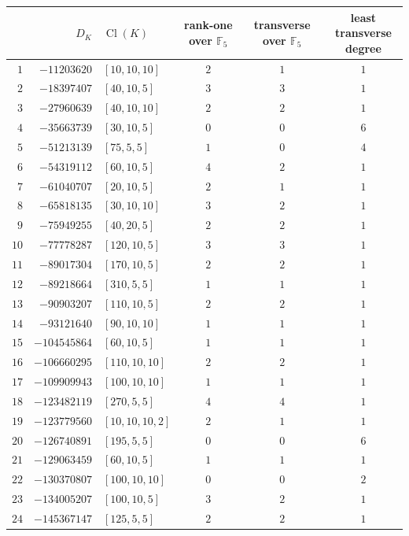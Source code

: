 \documentclass[11pt]{article}
\newcommand{\Ffive}{\mathbb F_5}
\newcommand{\Cl}{\operatorname{Cl}}
\begin{document}
\begin{center}\small
\setlength{\tabcolsep}{4.5pt}%
\begin{longtable}{r r l c c c}
\toprule
& $D_K$ & $\Cl(K)$ & rank-one over $\Ffive$ & transverse over $\Ffive$
& \shortstack{least transverse\\degree} \\
\midrule
\endhead
\bottomrule
\endfoot
$1$ & $-11203620$ & $[10,10,10]$ & $2$ & $1$ & $1$\\
$2$ & $-18397407$ & $[40,10,5]$ & $3$ & $3$ & $1$\\
$3$ & $-27960639$ & $[40,10,10]$ & $2$ & $2$ & $1$\\
$4$ & $-35663739$ & $[30,10,5]$ & $0$ & $0$ & $6$\\
$5$ & $-51213139$ & $[75,5,5]$ & $1$ & $0$ & $4$\\
$6$ & $-54319112$ & $[60,10,5]$ & $4$ & $2$ & $1$\\
$7$ & $-61040707$ & $[20,10,5]$ & $2$ & $1$ & $1$\\
$8$ & $-65818135$ & $[30,10,10]$ & $3$ & $2$ & $1$\\
$9$ & $-75949255$ & $[40,20,5]$ & $2$ & $2$ & $1$\\
$10$ & $-77778287$ & $[120,10,5]$ & $3$ & $3$ & $1$\\
$11$ & $-89017304$ & $[170,10,5]$ & $2$ & $2$ & $1$\\
$12$ & $-89218664$ & $[310,5,5]$ & $1$ & $1$ & $1$\\
$13$ & $-90903207$ & $[110,10,5]$ & $2$ & $2$ & $1$\\
$14$ & $-93121640$ & $[90,10,10]$ & $1$ & $1$ & $1$\\
$15$ & $-104545864$ & $[60,10,5]$ & $1$ & $1$ & $1$\\
$16$ & $-106660295$ & $[110,10,10]$ & $2$ & $2$ & $1$\\
$17$ & $-109909943$ & $[100,10,10]$ & $1$ & $1$ & $1$\\
$18$ & $-123482119$ & $[270,5,5]$ & $4$ & $4$ & $1$\\
$19$ & $-123779560$ & $[10,10,10,2]$ & $2$ & $1$ & $1$\\
$20$ & $-126740891$ & $[195,5,5]$ & $0$ & $0$ & $6$\\
$21$ & $-129063459$ & $[60,10,5]$ & $1$ & $1$ & $1$\\
$22$ & $-130370807$ & $[100,10,10]$ & $0$ & $0$ & $2$\\
$23$ & $-134005207$ & $[100,10,5]$ & $3$ & $2$ & $1$\\
$24$ & $-145367147$ & $[125,5,5]$ & $2$ & $2$ & $1$\\

\end{longtable}
\end{center}
\end{document}
